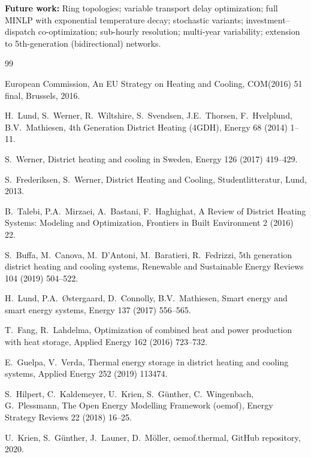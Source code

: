 \documentclass[review,3p]{elsarticle}
\begin{document}
\textbf{Future work:} Ring topologies; variable transport delay
optimization; full MINLP with exponential temperature decay;
stochastic variants; investment--dispatch co-optimization;
sub-hourly resolution; multi-year variability; extension to
5th-generation (bidirectional) networks.


\begin{thebibliography}{99}

European Commission, An EU Strategy on Heating and Cooling,
COM(2016) 51 final, Brussels, 2016.

H.\ Lund, S.\ Werner, R.\ Wiltshire, S.\ Svendsen, J.E.\ Thorsen,
F.\ Hvelplund, B.V.\ Mathiesen,
4th Generation District Heating (4GDH),
Energy 68 (2014) 1--11.

S.\ Werner,
District heating and cooling in Sweden,
Energy 126 (2017) 419--429.

S.\ Frederiksen, S.\ Werner,
District Heating and Cooling, Studentlitteratur, Lund, 2013.

B.\ Talebi, P.A.\ Mirzaei, A.\ Bastani, F.\ Haghighat,
A Review of District Heating Systems: Modeling and Optimization,
Frontiers in Built Environment 2 (2016) 22.

S.\ Buffa, M.\ Canova, M.\ D'Antoni, M.\ Baratieri, R.\ Fedrizzi,
5th generation district heating and cooling systems,
Renewable and Sustainable Energy Reviews 104 (2019) 504--522.

H.\ Lund, P.A.\ Østergaard, D.\ Connolly, B.V.\ Mathiesen,
Smart energy and smart energy systems,
Energy 137 (2017) 556--565.

T.\ Fang, R.\ Lahdelma,
Optimization of combined heat and power production with heat storage,
Applied Energy 162 (2016) 723--732.

E.\ Guelpa, V.\ Verda,
Thermal energy storage in district heating and cooling systems,
Applied Energy 252 (2019) 113474.

S.\ Hilpert, C.\ Kaldemeyer, U.\ Krien, S.\ Günther,
C.\ Wingenbach, G.\ Plessmann,
The Open Energy Modelling Framework (oemof),
Energy Strategy Reviews 22 (2018) 16--25.

U.\ Krien, S.\ Günther, J.\ Launer, D.\ Möller,
oemof.thermal, GitHub repository, 2020.


\end{thebibliography}
\end{document}
